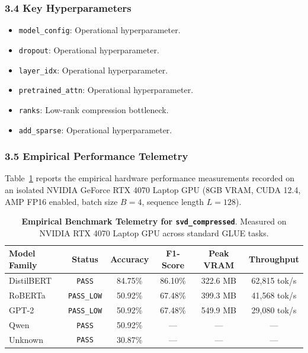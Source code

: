 \subsubsection*{3.4 Key Hyperparameters}
\begin{itemize}
    \item \texttt{model\_config}: Operational hyperparameter.
    \item \texttt{dropout}: Operational hyperparameter.
    \item \texttt{layer\_idx}: Operational hyperparameter.
    \item \texttt{pretrained\_attn}: Operational hyperparameter.
    \item \texttt{ranks}: Low-rank compression bottleneck.
    \item \texttt{add\_sparse}: Operational hyperparameter.
\end{itemize}

\subsubsection*{3.5 Empirical Performance Telemetry}
Table~\ref{tab:telemetry_svd_compressed} reports the empirical hardware performance measurements recorded on an isolated NVIDIA GeForce RTX 4070 Laptop GPU (8GB VRAM, CUDA 12.4, AMP FP16 enabled, batch size $B=4$, sequence length $L=128$).

\begin{table}[h]
\centering
\small
\caption{\textbf{Empirical Benchmark Telemetry for \texttt{svd\_compressed}}. Measured on NVIDIA RTX 4070 Laptop GPU across standard GLUE tasks.}
\label{tab:telemetry_svd_compressed}
\begin{tabular*}{\columnwidth}{@{\extracolsep{\fill}}lccccc}
\toprule
\textbf{Model Family} & \textbf{Status} & \textbf{Accuracy} & \textbf{F1-Score} & \textbf{Peak VRAM} & \textbf{Throughput} \\
\midrule
DistilBERT & \texttt{PASS} & 84.75\% & 86.10\% & 322.6 MB & 62,815 tok/s \\
RoBERTa & \texttt{PASS\_LOW} & 50.92\% & 67.48\% & 399.3 MB & 41,568 tok/s \\
GPT-2 & \texttt{PASS\_LOW} & 50.92\% & 67.48\% & 549.9 MB & 29,080 tok/s \\
Qwen & \texttt{PASS} & 50.92\% & --- & --- & --- \\
Unknown & \texttt{PASS} & 30.87\% & --- & --- & --- \\
\bottomrule
\end{tabular*}
\end{table}

